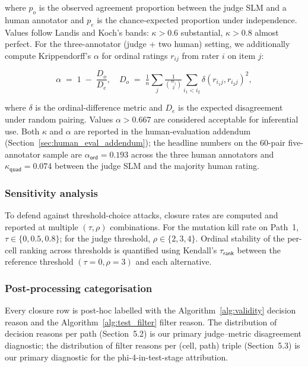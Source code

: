 where $p_o$ is the observed agreement proportion between the judge SLM and a human annotator and $p_e$ is the chance-expected proportion under independence. Values follow Landis and Koch's bands: $\kappa > 0.6$ substantial, $\kappa > 0.8$ almost perfect. For the three-annotator (judge + two human) setting, we additionally compute Krippendorff's $\alpha$ for ordinal ratings $r_{ij}$ from rater $i$ on item $j$:

\begin{equation}
  \alpha
  \;=\;
  1 \;-\; \frac{D_o}{D_e},
  \quad
  D_o \;=\; \tfrac{1}{n}\sum_{j} \tfrac{1}{\binom{m_j}{2}}
            \sum_{i_1 < i_2} \delta(r_{i_1 j}, r_{i_2 j})^2,
  \label{eq:alpha}
\end{equation}

where $\delta$ is the ordinal-difference metric and $D_e$ is the expected disagreement under random pairing. Values $\alpha > 0.667$ are considered acceptable for inferential use. Both $\kappa$ and $\alpha$ are reported in the human-evaluation addendum (Section~\ref{sec:human_eval_addendum}); the headline numbers on the 60-pair five-annotator sample are $\alpha_{\textsf{ord}} = 0.193$ across the three human annotators and $\kappa_{\textsf{quad}} = 0.074$ between the judge SLM and the majority human rating.

\subsubsection{Sensitivity analysis}

To defend against threshold-choice attacks, closure rates are computed and reported at multiple $(\tau, \rho)$ combinations. For the mutation kill rate on Path~1, $\tau \in \{0, 0.5, 0.8\}$; for the judge threshold, $\rho \in \{2, 3, 4\}$. Ordinal stability of the per-cell ranking across thresholds is quantified using Kendall's $\tau_{\textsf{rank}}$ between the reference threshold $(\tau=0, \rho=3)$ and each alternative.

\subsubsection{Post-processing categorisation}

Every closure row is post-hoc labelled with the Algorithm~\ref{alg:validity} decision reason and the Algorithm~\ref{alg:test_filter} filter reason. The distribution of decision reasons per path (Section~5.2) is our primary judge--metric disagreement diagnostic; the distribution of filter reasons per (cell, path) triple (Section~5.3) is our primary diagnostic for the phi-4-in-test-stage attribution.

